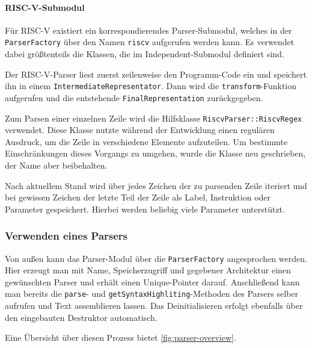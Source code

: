 \paragraph{RISC-V-Submodul}

Für RISC-V existiert ein korrespondierendes Parser-Submodul, welches in der
\texttt{ParserFactory} über den Namen \texttt{riscv} aufgerufen werden kann. Es
verwendet dabei größtenteils die Klassen, die im Independent-Submodul definiert
sind.

Der RISC-V-Parser liest zuerst zeilenweise den Programm-Code ein und speichert
ihn in einem \texttt{Intermediate\-Representator}. Dann wird die
\texttt{transform}-Funktion aufgerufen und die entstehende
\texttt{Final\-Representation} zurückgegeben.

Zum Parsen einer einzelnen Zeile wird die Hilfsklasse
\texttt{RiscvParser::\allowbreak{}RiscvRegex} verwendet. Diese Klasse nutzte
während der Entwicklung einen regulären Ausdruck, um die Zeile in verschiedene
Elemente aufzuteilen. Um bestimmte Einschränkungen dieses Vorgangs zu umgehen,
wurde die Klasse neu geschrieben, der Name aber beibehalten.

Nach aktuellem Stand wird über jedes Zeichen der zu parsenden Zeile iteriert und
bei gewissen Zeichen der letzte Teil der Zeile als Label, Instruktion oder
Parameter gespeichert. Hierbei werden beliebig viele Parameter unterstützt.

\subsubsection{Verwenden eines Parsers}

Von außen kann das Parser-Modul über die \texttt{ParserFactory} angesprochen
werden. Hier erzeugt man mit Name, Speicherzugriff und gegebener Architektur
einen gewünschten Parser und erhält einen Unique-Pointer darauf. Anschließend
kann man bereits die \texttt{parse}- und \texttt{getSyntaxHighliting}-Methoden
des Parsers selber aufrufen und Text assemblieren lassen. Das Deinitialisieren
erfolgt ebenfalls über den eingebauten Destruktor automatisch.

Eine Übersicht über diesen Prozess bietet \autoref{fig:parser-overview}.

